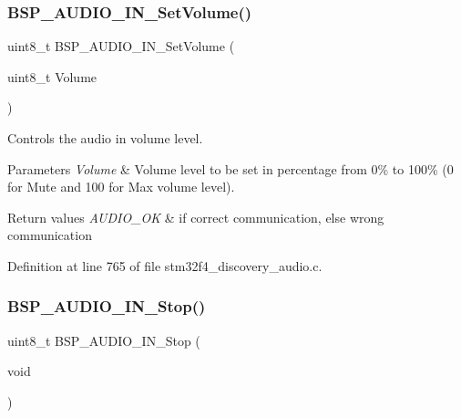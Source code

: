 \subsubsection{\texorpdfstring{B\+S\+P\+\_\+\+A\+U\+D\+I\+O\+\_\+\+I\+N\+\_\+\+Set\+Volume()}{BSP\_AUDIO\_IN\_SetVolume()}}
{\footnotesize\ttfamily uint8\+\_\+t B\+S\+P\+\_\+\+A\+U\+D\+I\+O\+\_\+\+I\+N\+\_\+\+Set\+Volume (\begin{DoxyParamCaption}\item[{uint8\+\_\+t}]{Volume }\end{DoxyParamCaption})}



Controls the audio in volume level. 


\begin{DoxyParams}{Parameters}
{\em Volume} & Volume level to be set in percentage from 0\% to 100\% (0 for Mute and 100 for Max volume level). \\
\hline
\end{DoxyParams}

\begin{DoxyRetVals}{Return values}
{\em A\+U\+D\+I\+O\+\_\+\+OK} & if correct communication, else wrong communication \\
\hline
\end{DoxyRetVals}


Definition at line 765 of file stm32f4\+\_\+discovery\+\_\+audio.\+c.

\mbox{\label{group___s_t_m32_f4___d_i_s_c_o_v_e_r_y___a_u_d_i_o___i_n___private___functions_ga71122b966773b01c8a5933c76f3f12fe}} 
\subsubsection{\texorpdfstring{B\+S\+P\+\_\+\+A\+U\+D\+I\+O\+\_\+\+I\+N\+\_\+\+Stop()}{BSP\_AUDIO\_IN\_Stop()}}
{\footnotesize\ttfamily uint8\+\_\+t B\+S\+P\+\_\+\+A\+U\+D\+I\+O\+\_\+\+I\+N\+\_\+\+Stop (\begin{DoxyParamCaption}\item[{void}]{ }\end{DoxyParamCaption})}



